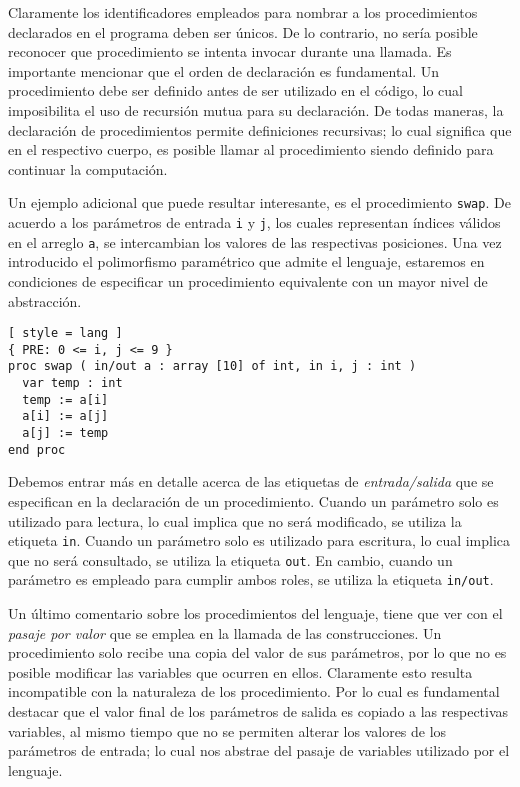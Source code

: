 Claramente los identificadores empleados para nombrar a los procedimientos declarados en el programa deben ser únicos.
De lo contrario, no sería posible reconocer que procedimiento se intenta invocar durante una llamada.
Es importante mencionar que el orden de declaración es fundamental.
Un procedimiento debe ser definido antes de ser utilizado en el código, lo cual imposibilita el uso de recursión mutua para su declaración.
De todas maneras, la declaración de procedimientos permite definiciones recursivas; lo cual significa que en el respectivo cuerpo, es posible llamar al procedimiento siendo definido para continuar la computación.

Un ejemplo adicional que puede resultar interesante, es el procedimiento \lstinline[style = lang]{swap}.
De acuerdo a los parámetros de entrada \lstinline[style = lang]{i} y \lstinline[style = lang]{j}, los cuales representan índices válidos en el arreglo \lstinline[style = lang]{a}, se intercambian los valores de las respectivas posiciones.
Una vez introducido el polimorfismo paramétrico que admite el lenguaje, estaremos en condiciones de especificar un procedimiento equivalente con un mayor nivel de abstracción.

\begin{lstlisting}[ style = lang ]
{ PRE: 0 <= i, j <= 9 }
proc swap ( in/out a : array [10] of int, in i, j : int )
  var temp : int
  temp := a[i]
  a[i] := a[j]
  a[j] := temp
end proc
\end{lstlisting}

Debemos entrar más en detalle acerca de las etiquetas de \textit{entrada/salida} que se especifican en la declaración de un procedimiento.
Cuando un parámetro solo es utilizado para lectura, lo cual implica que no será modificado, se utiliza la etiqueta \lstinline[style = lang]{in}.
Cuando un parámetro solo es utilizado para escritura, lo cual implica que no será consultado, se utiliza la etiqueta \lstinline[style = lang]{out}.
En cambio, cuando un parámetro es empleado para cumplir ambos roles, se utiliza la etiqueta \lstinline[style = lang]{in/out}.

Un último comentario sobre los procedimientos del lenguaje, tiene que ver con el \textit{pasaje por valor} que se emplea en la llamada de las construcciones.
Un procedimiento solo recibe una copia del valor de sus parámetros, por lo que no es posible modificar las variables que ocurren en ellos.
Claramente esto resulta incompatible con la naturaleza de los procedimiento.
Por lo cual es fundamental destacar que el valor final de los parámetros de salida es copiado a las respectivas variables, al mismo tiempo que no se permiten alterar los valores de los parámetros de entrada; lo cual nos abstrae del pasaje de variables utilizado por el lenguaje.
\fi

